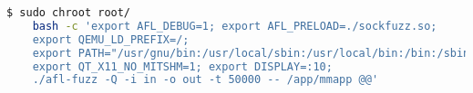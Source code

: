 
\begin{lstlisting}[language=bash, style=chroot, caption={Wechseln in ein anderes Wurzelverzeichnis mit chroot und ausführen von AFL},label={lst:chroot-fuzzen}]
$ sudo chroot root/
    bash -c 'export AFL_DEBUG=1; export AFL_PRELOAD=./sockfuzz.so;
    export QEMU_LD_PREFIX=/;
    export PATH="/usr/gnu/bin:/usr/local/sbin:/usr/local/bin:/bin:/sbin:/usr/bin:.";
    export QT_X11_NO_MITSHM=1; export DISPLAY=:10;
    ./afl-fuzz -Q -i in -o out -t 50000 -- /app/mmapp @@'
\end{lstlisting}